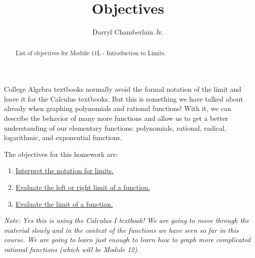 \documentclass{ximera}
\author{Darryl Chamberlain Jr.}
\title{Objectives}
\begin{document}
\begin{abstract}
List of objectives for Module 11L - Introduction to Limits.
\end{abstract}
\maketitle

College Algebra textbooks normally avoid the formal notation of the limit and leave it for the Calculus textbooks. But this is something we have talked about already when graphing polynomials and rational functions! With it, we can describe the behavior of many more functions and allow us to get a better understanding of our elementary functions: polynomials, rational, radical, logarithmic, and exponential functions. 

The objectives for this homework are: 
\begin{enumerate}
\item  \href{https://cnx.org/contents/i4nRcikn@5.1:dKCfyV9u@5/The-Limit-of-a-Function}{Interpret the notation for limits.}
\item \href{https://cnx.org/contents/i4nRcikn@5.1:dKCfyV9u@5/The-Limit-of-a-Function}{Evaluate the left or right limit of a function.}
\item \href{https://cnx.org/contents/i4nRcikn@5.1:dKCfyV9u@5/The-Limit-of-a-Function}{Evaluate the limit of a function.}
\end{enumerate}

\textit{Note: Yes this is using the Calculus I textbook! We are going to move through the material slowly and in the context of the functions we have seen so far in this course. We are going to learn just enough to learn how to graph more complicated rational functions (which will be Module 12).}
\end{document}
